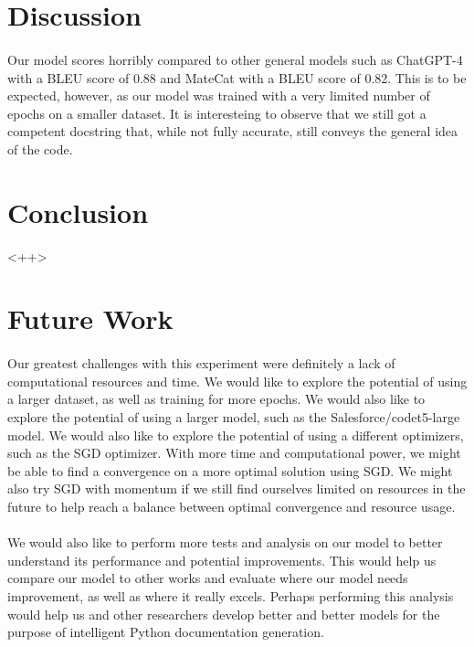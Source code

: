 \documentclass[12pt]{article}
\begin{document}
	\section{Discussion}
	\paragraph{} Our model scores horribly compared to other general models such as ChatGPT-4 with a BLEU score of 0.88 and MateCat with a BLEU score of 0.82. \cite{ghassemiazghandi2024evaluation} This is to be expected, however, as our model was trained with a very limited number of epochs on a smaller dataset. It is interesteing to observe that we still got a competent docstring that, while not fully accurate, still conveys the general idea of the code. 

	\section{Conclusion}
	<++>

	\section{Future Work}
	\paragraph{} Our greatest challenges with this experiment were definitely a lack of computational resources and time. We would like to explore the potential of using a larger dataset, as well as training for more epochs. We would also like to explore the potential of using a larger model, such as the Salesforce/codet5-large model. We would also like to explore the potential of using a different optimizers, such as the SGD optimizer. With more time and computational power, we might be able to find a convergence on a more optimal solution using SGD. We might also try SGD with momentum if we still find ourselves limited on resources in the future to help reach a balance between optimal convergence and resource usage.
	\paragraph{} We would also like to perform more tests and analysis on our model to better understand its performance and potential improvements. This would help us compare our model to other works and evaluate where our model needs improvement, as well as where it really excels. Perhaps performing this analysis would help us and other researchers develop better and better models for the purpose of intelligent Python documentation generation.

	\pagebreak
	
	
\end{document}
